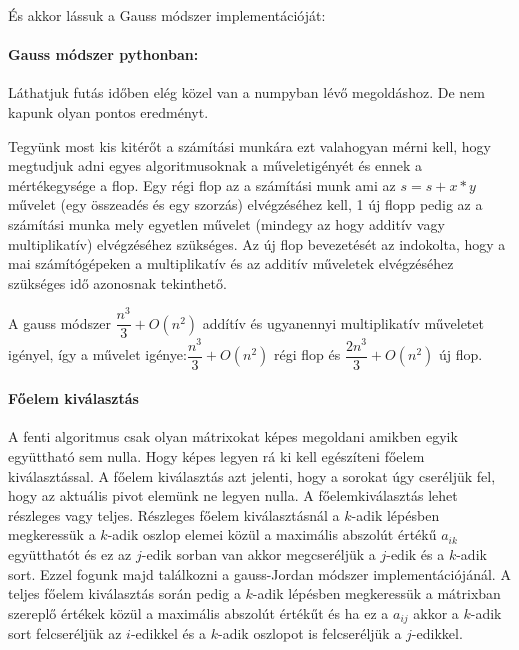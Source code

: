   \begin{python}

\end{python}

    És akkor lássuk a Gauss módszer implementációját:

    \paragraph{Gauss módszer pythonban:}\label{gauss-muxf3dszer-pythonban}

   \begin{python}

\end{python}

    Láthatjuk futás időben elég közel van a numpyban lévő megoldáshoz. De
nem kapunk olyan pontos eredményt.

    Tegyünk most kis kitérőt a számítási munkára ezt valahogyan mérni kell,
hogy megtudjuk adni egyes algoritmusoknak a műveletigényét és ennek a
mértékegysége a flop. Egy régi flop az a számítási munk ami az
\(s=s+x*y\) művelet (egy összeadés és egy szorzás) elvégzéséhez kell, 1
új flopp pedig az a számítási munka mely egyetlen művelet (mindegy az
hogy additív vagy multiplikatív) elvégzéséhez szükséges. Az új flop
bevezetését az indokolta, hogy a mai számítógépeken a multiplikatív és
az additív műveletek elvégzéséhez szükséges idő azonosnak tekinthető.

    A gauss módszer $\dfrac{n^3}{3} + O(n^2)$ addítív és ugyanennyi
multiplikatív műveletet igényel, így a művelet igénye:\(\dfrac {n^3}{3}+
O(n^2) \) régi flop és \(\dfrac {2n^3}{3}+ O(n^2) \) új flop.

    \paragraph{Főelem kiválasztás}\label{fux151elem-kivuxe1lasztuxe1s}

    A fenti algoritmus csak olyan mátrixokat képes megoldani amikben egyik
együttható sem nulla. Hogy képes legyen rá ki kell egészíteni főelem
kiválasztással. A főelem kiválasztás azt jelenti, hogy a sorokat úgy
cseréljük fel, hogy az aktuális pivot elemünk ne legyen nulla. A
főelemkiválasztás lehet részleges vagy teljes. Részleges főelem
kiválasztásnál a \(k\)-adik lépésben megkeressük a \(k\)-adik oszlop
elemei közül a maximális abszolút értékű \(a_{ik}\) együtthatót és ez az
\(j\)-edik sorban van akkor megcseréljük a \(j\)-edik és a \(k\)-adik
sort. Ezzel fogunk majd találkozni a gauss-Jordan módszer
implementációjánál. A teljes főelem kiválasztás során pedig a \(k\)-adik
lépésben megkeressük a mátrixban szereplő értékek közül a maximális
abszolút értékűt és ha ez a \(a_{ij}\) akkor a \(k\)-adik sort
felcseréljük az \(i\)-edikkel és a \(k\)-adik oszlopot is felcseréljük a
\(j\)-edikkel.

